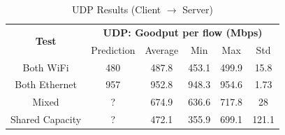         \begin{table}[H]
            \small
            \centering
            \begin{tabular}{|ll|lllll|}
            \hline
            \multicolumn{2}{|c|}{\multirow{2}{*}{\textbf{Test}}} & 
                \multicolumn{5}{c|}{\textbf{UDP: Goodput per flow (Mbps)}} \\
            \cline{3-7}
            \multicolumn{2}{|c|}{} &
                \multicolumn{1}{c|}{Prediction} &
                \multicolumn{1}{c|}{Average} &
                \multicolumn{1}{c|}{Min} &
                \multicolumn{1}{c|}{Max} &
                \multicolumn{1}{c|}{Std} \\
            \hline
            \multicolumn{2}{|c|}{Both WiFi} &
                \multicolumn{1}{c|}{480} &
                \multicolumn{1}{c|}{487.8} &
                \multicolumn{1}{c|}{453.1} &
                \multicolumn{1}{c|}{499.9} &
                \multicolumn{1}{c|}{15.8} \\
            \hline
            \multicolumn{2}{|c|}{Both Ethernet} &
                \multicolumn{1}{c|}{957} &
                \multicolumn{1}{c|}{952.8} &
                \multicolumn{1}{c|}{948.3} &
                \multicolumn{1}{c|}{954.6} &
                \multicolumn{1}{c|}{1.73} \\
            \hline
            \multicolumn{2}{|c|}{Mixed} &
                \multicolumn{1}{c|}{?} &
                \multicolumn{1}{c|}{674.9} &
                \multicolumn{1}{c|}{636.6} &
                \multicolumn{1}{c|}{717.8} &
                \multicolumn{1}{c|}{28} \\
            \hline
            \multicolumn{2}{|c|}{Shared Capacity} &
                \multicolumn{1}{c|}{?} &
                \multicolumn{1}{c|}{472.1} &
                \multicolumn{1}{c|}{355.9} &
                \multicolumn{1}{c|}{699.1} &
                \multicolumn{1}{c|}{121.1} \\
            \hline
            \end{tabular}
            \vspace{0.5cm}
            \caption{UDP Results (Client $\rightarrow$ Server)}
            \label{tab:udp-results}
        \end{table}

